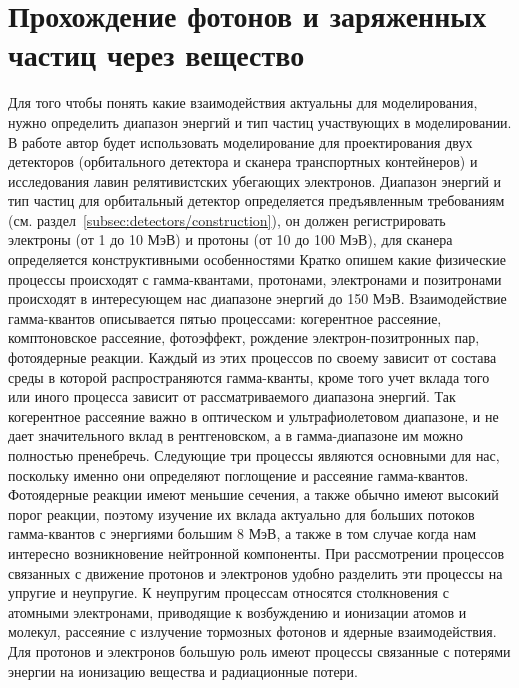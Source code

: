 \section{Прохождение фотонов и заряженных частиц через вещество}\label{sec:theory/propagation}
Для того чтобы понять какие взаимодействия актуальны для моделирования, нужно определить диапазон энергий и тип частиц участвующих в моделировании. В работе автор будет использовать моделирование для проектирования двух детекторов (орбитального детектора и сканера транспортных контейнеров) и исследования лавин релятивистских убегающих электронов. Диапазон энергий и тип частиц для  орбитальный детектор определяется предъявленным требованиям (см. раздел~\ref{subsec:detectors/construction}), он должен регистрировать электроны (от 1 до 10 МэВ) и протоны (от 10 до 100 МэВ), для сканера определяется конструктивными особенностями
Кратко опишем какие физические процессы происходят с гамма-квантами, протонами, электронами и позитронами происходят в интересующем нас диапазоне энергий до 150 МэВ. Взаимодействие гамма-квантов описывается пятью процессами: когерентное рассеяние, комптоновское рассеяние, фотоэффект, рождение электрон-позитронных пар, фотоядерные реакции. Каждый из этих процессов по своему зависит от состава среды в которой распространяются гамма-кванты, кроме того учет вклада того или иного процесса зависит от рассматриваемого диапазона энергий. Так когерентное рассеяние важно в оптическом и ультрафиолетовом диапазоне, и не дает значительного вклад в рентгеновском, а в гамма-диапазоне им можно полностью пренебречь. Следующие три процессы являются основными для нас, поскольку именно они определяют поглощение и рассеяние гамма-квантов. Фотоядерные реакции имеют меньшие сечения, а также обычно имеют высокий порог реакции, поэтому изучение их вклада актуально для больших потоков гамма-квантов с энергиями большим 8 МэВ, а также в том случае когда нам интересно возникновение нейтронной компоненты.
При рассмотрении процессов связанных с движение протонов и электронов удобно разделить эти процессы на упругие и неупругие. К неупругим процессам относятся столкновения с атомными электронами, приводящие к возбуждению и ионизации атомов и молекул, рассеяние с излучение тормозных фотонов и ядерные взаимодействия. 
Для протонов и электронов большую роль имеют процессы связанные с потерями энергии на ионизацию вещества и радиационные потери.  



